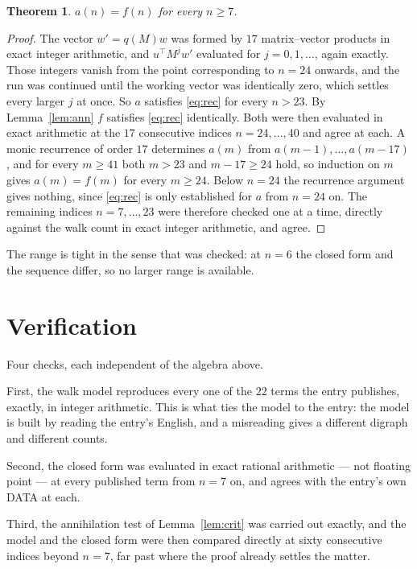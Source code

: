 \documentclass[11pt,a4paper]{article}
\theoremstyle{plain}
\newtheorem{theorem}{Theorem}
\theoremstyle{definition}
\begin{document}
\begin{theorem}
$a(n)=f(n)$ for every $n\ge7$.
\end{theorem}

\begin{proof}
The vector $w'=q(M)w$ was formed by $17$ matrix--vector products in exact integer
arithmetic, and $u^{\!\top}M^{j}w'$ evaluated for $j=0,1,\dots$, again exactly. Those integers
vanish from the point corresponding to $n=24$ onwards, and the run was continued until the
working vector was identically zero, which settles every larger $j$ at once. So $a$ satisfies
\eqref{eq:rec} for every $n>23$. By Lemma~\ref{lem:ann} $f$ satisfies \eqref{eq:rec}
identically. Both were then evaluated in exact arithmetic at the $17$ consecutive indices
$n=24,\dots,40$ and agree at each. A monic recurrence of order $17$
determines $a(m)$ from $a(m-1),\dots,a(m-17)$, and for every $m\ge41$ both
$m>23$ and $m-17\ge24$ hold, so induction on $m$ gives $a(m)=f(m)$ for every
$m\ge24$.
Below $n=24$ the recurrence argument gives nothing, since \eqref{eq:rec} is only
established for $a$ from $n=24$ on. The remaining indices $n=7,\dots,23$ were
therefore checked one at a time, directly against the walk count in exact integer arithmetic,
and agree.
\end{proof}

The range is tight in the sense that was checked: at $n=6$ the closed form and the sequence differ, so no larger range is available.

\section{Verification}

Four checks, each independent of the algebra above.

First, the walk model reproduces every one of the $22$ terms the entry publishes,
exactly, in integer arithmetic. This is what ties the model to the entry: the model is built
by reading the entry's English, and a misreading gives a different digraph and different
counts.

Second, the closed form was evaluated in exact rational arithmetic --- not floating point ---
at every published term from $n=7$ on, and agrees with the entry's own DATA at each.

Third, the annihilation test of Lemma~\ref{lem:crit} was carried out exactly, and the model
and the closed form were then compared directly at sixty consecutive indices beyond
$n=7$, far past where the proof already settles the matter.
\end{document}

